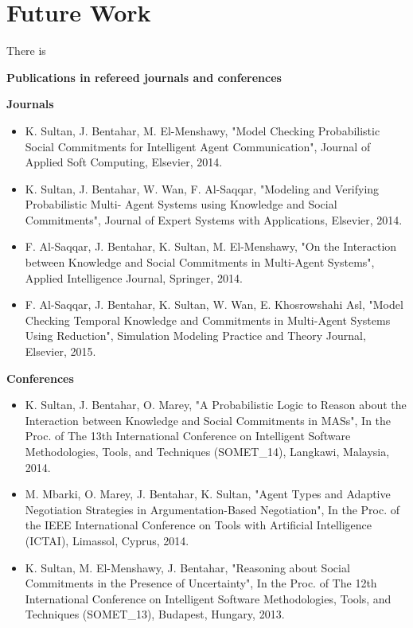 \section{Future Work}

There is

\newpage
\textbf{Publications in refereed journals and conferences}

\textbf{Journals}

\begin{itemize}
\item K. Sultan, J. Bentahar, M. El-Menshawy, "Model Checking Probabilistic Social Commitments for Intelligent Agent Communication", Journal of Applied Soft Computing, Elsevier, 2014.

\item K. Sultan, J. Bentahar, W. Wan, F. Al-Saqqar, "Modeling and Verifying Probabilistic Multi-  Agent Systems using Knowledge and Social Commitments", Journal of Expert Systems with Applications, Elsevier, 2014.

\item F. Al-Saqqar, J. Bentahar, K. Sultan, M. El-Menshawy, "On the Interaction between Knowledge and Social Commitments in Multi-Agent Systems", Applied Intelligence Journal, Springer, 2014.

\item F. Al-Saqqar, J. Bentahar, K. Sultan, W. Wan, E. Khosrowshahi
Asl, "Model Checking Temporal Knowledge and Commitments in Multi-Agent Systems Using Reduction", Simulation Modeling Practice and Theory Journal, Elsevier, 2015.
\end{itemize}

\textbf{Conferences}

\begin{itemize}

\item K. Sultan, J. Bentahar, O. Marey, "A Probabilistic Logic to Reason about the Interaction between Knowledge and Social Commitments in MASs", In the Proc. of The 13th International Conference on Intelligent Software Methodologies, Tools, and Techniques (SOMET\_14), Langkawi, Malaysia, 2014.

\item M. Mbarki, O. Marey, J. Bentahar, K. Sultan,  "Agent Types and Adaptive Negotiation Strategies in Argumentation-Based Negotiation", In the Proc. of the IEEE International Conference on Tools with Artificial Intelligence (ICTAI), Limassol, Cyprus, 2014.

\item K. Sultan, M. El-Menshawy, J. Bentahar, "Reasoning about Social Commitments in the Presence of Uncertainty", In the Proc. of The 12th International Conference on Intelligent Software Methodologies, Tools, and Techniques (SOMET\_13), Budapest, Hungary, 2013.
\end{itemize}

